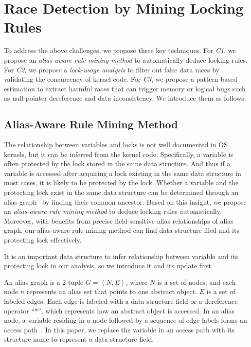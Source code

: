 \section{Race Detection by Mining Locking Rules}
\label{sec_technique}
To address the above challenges, we propose three key techniques. For {\em C1}, 
we propose an {\em alias-aware rule mining method} to automatically deduce 
locking rules. For {\em C2}, we propose a {\em lock-usage analysis} to filter 
out false data races by validating the concurrency of kernel code. For {\em 
C3}, we propose a pattern-based estimation to extract harmful races that can 
trigger memory or logical bugs such as null-pointer dereference and data 
inconsistency. We introduce them as follows:

\subsection{Alias-Aware Rule Mining Method}
\label{subsec_rule_mining}
The relationship between variables and locks is not well documented in OS 
kernels, but it can be inferred from the kernel code. Specifically, a variable 
is often protected by the lock stored in the same data structure. And thus if a 
variable is accessed after acquiring a lock existing in the same data structure 
in most cases, it is likely to be protected by the lock. Whether a variable and 
the protecting lock exist in the same data structure can be determined through 
an alias graph~\cite{Li:ASPLOS22, Kastrinis:CC18} by finding their common 
ancestor. Based on this insight, we propose an {\em alias-aware rule mining 
method} to deduce locking rules automatically. Moreover, with benefits from 
precise field-sensitive alias relationships of alias graph, our alias-aware 
rule mining method can find data structure filed and its protecting lock 
effectively.

 It is an important data structure to infer relationship 
between variable and its protecting lock in our analysis, so we introduce it 
and its update first. 

An alias graph is a 2-tuple $\mathit{G = \left<N, E\right>}$, where 
$\mathit{N}$ is a set of nodes, and each node $\mathit{n}$ represents an alias 
set that points to one abstract object. $\mathit{E}$ is a set of labeled edges. 
Each edge is labeled with a data structure field or a dereference operator 
``$\mathit{*}$'', which represents how an abstract object is accessed. In an 
alias node, a variable residing in a node followed by a sequence of edge
labels forms an access path~\cite{Kastrinis:CC18, Cheng:PLDI00}. In this paper, 
we replace the variable in an access path with its structure name to represent 
a data structure field.

